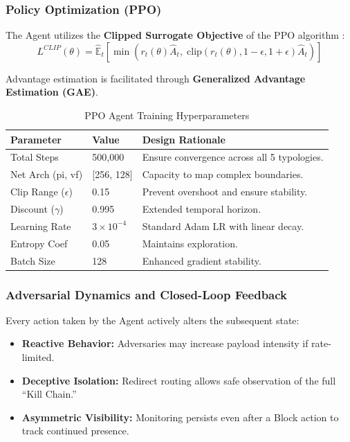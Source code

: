 \documentclass[12pt,a4paper]{report}
\begin{document}
\subsubsection{Policy Optimization (PPO)}

The Agent utilizes the \textbf{Clipped Surrogate Objective} of the PPO algorithm \cite{schulmanPPO2017}:
\begin{equation}
L^{CLIP}(\theta) = \hat{\mathbb{E}}_t\left[\min\left(r_t(\theta)\hat{A}_t,\; \text{clip}(r_t(\theta), 1-\epsilon, 1+\epsilon)\hat{A}_t\right)\right]
\end{equation}

Advantage estimation is facilitated through \textbf{Generalized Advantage Estimation (GAE)}.

\begin{table}[htbp]
\centering
\caption{PPO Agent Training Hyperparameters}
\label{tab:ppo_hyperparams}
\begin{tabular}{L{3.5cm} L{3cm} L{8cm}}
\toprule
\textbf{Parameter} & \textbf{Value} & \textbf{Design Rationale} \\
\midrule
Total Steps & 500,000 & Ensure convergence across all 5 typologies. \\
Net Arch (pi, vf) & [256, 128] & Capacity to map complex boundaries. \\
Clip Range ($\epsilon$) & 0.15 & Prevent overshoot and ensure stability. \\
Discount ($\gamma$) & 0.995 & Extended temporal horizon. \\
Learning Rate & $3 \times 10^{-4}$ & Standard Adam LR with linear decay. \\
Entropy Coef & 0.05 & Maintains exploration. \\
Batch Size & 128 & Enhanced gradient stability. \\
\bottomrule
\end{tabular}
\end{table}

\subsubsection{Adversarial Dynamics and Closed-Loop Feedback}

Every action taken by the Agent actively alters the subsequent state:
\begin{itemize}
    \item \textbf{Reactive Behavior:} Adversaries may increase payload intensity if rate-limited.
    \item \textbf{Deceptive Isolation:} Redirect routing allows safe observation of the full ``Kill Chain.''
    \item \textbf{Asymmetric Visibility:} Monitoring persists even after a Block action to track continued presence.
\end{itemize}
\end{document}

